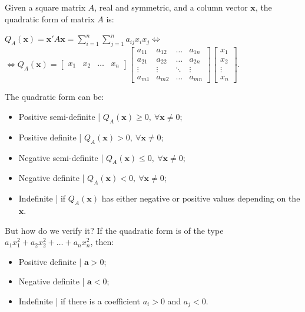 \documentclass[0pt, a4paper]{article}
\begin{document}
Given a square matrix $A$, real and symmetric, and a column vector $\textbf{x}$, the quadratic form of matrix $A$ is:
\begin{center}
	$Q_A(\textbf{x})=\textbf{x}'A\textbf{x}=\sum_{i=1}^{n}\sum_{j=1}^{n}a_{ij}x_ix_j\Leftrightarrow$\\
	$\Leftrightarrow Q_A(\textbf{x})= \begin{bmatrix}
	x_1 & x_2 & \dots & x_n
	\end{bmatrix} 
	\begin{bmatrix}
	a_{11} & a_{12} & \dots & a_{1n}\\ 
	a_{21} & a_{22} & \dots & a_{2n}\\ 
	\vdots & \vdots & \ddots & \vdots \\ 
	a_{m1} & a_{m2} & \dots & a_{mn}
	\end{bmatrix}
	\begin{bmatrix}
	x_1\\ 
	x_2\\ 
	\vdots\\ 
	x_n
	\end{bmatrix}.$
\end{center}

The quadratic form can be:
\begin{itemize}
	\item Positive semi-definite | $Q_A(\textbf{x})\geq0,\ \forall\textbf{x}\neq0$;
	\item Positive definite | $Q_A(\textbf{x})>0,\ \forall\textbf{x}\neq0$;
	\item Negative semi-definite | $Q_A(\textbf{x})\leq0,\ \forall\textbf{x}\neq0$;
	\item Negative definite | $Q_A(\textbf{x})<0,\ \forall\textbf{x}\neq0$;
	\item Indefinite | if $Q_A(\textbf{x})$ has either negative or positive values depending on the $\textbf{x}$.
\end{itemize}

But how do we verify it? If the quadratic form is of the type $a_1x_1^2+a_2x_2^2+\dots+a_nx_n^2$, then:
\begin{itemize}
	\item Positive definite | $\textbf{a}>0$;
	\item Negative definite | $\textbf{a}<0$;
	\item Indefinite | if there is a coefficient $a_i>0$ and $a_j<0$.
\end{itemize}
\end{document}
